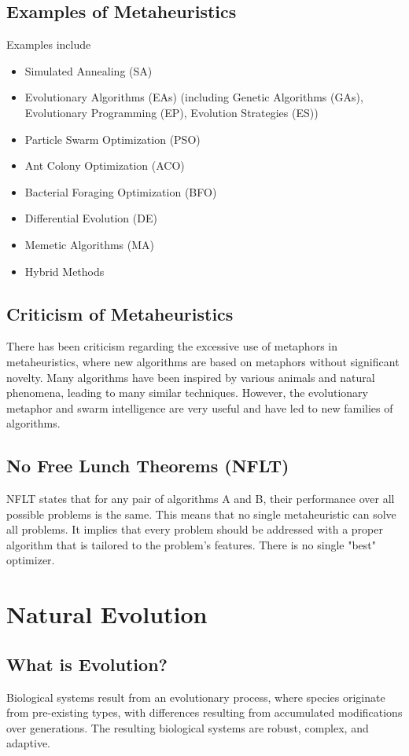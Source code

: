 \subsection*{Examples of Metaheuristics}
Examples include
\begin{itemize}
    \item Simulated Annealing (SA)
    \item Evolutionary Algorithms (EAs) (including Genetic Algorithms (GAs), Evolutionary Programming (EP), Evolution Strategies (ES))
    \item Particle Swarm Optimization (PSO)
    \item Ant Colony Optimization (ACO)
    \item Bacterial Foraging Optimization (BFO)
    \item Differential Evolution (DE)
    \item Memetic Algorithms (MA)
    \item Hybrid Methods
\end{itemize}

\subsection*{Criticism of Metaheuristics}
There has been criticism regarding the excessive use of metaphors in metaheuristics, where new algorithms are based on metaphors without significant novelty. Many algorithms have been inspired by various animals and natural phenomena, leading to many similar techniques. However, the evolutionary metaphor and swarm intelligence are very useful and have led to new families of algorithms.

\subsection*{No Free Lunch Theorems (NFLT)}
NFLT states that for any pair of algorithms A and B, their performance over all possible problems is the same. This means that no single metaheuristic can solve all problems. It implies that every problem should be addressed with a proper algorithm that is tailored to the problem's features. There is no single "best" optimizer.

\section{Natural Evolution}
\subsection*{What is Evolution?}
Biological systems result from an evolutionary process, where species originate from pre-existing types, with differences resulting from accumulated modifications over generations. The resulting biological systems are robust, complex, and adaptive.

